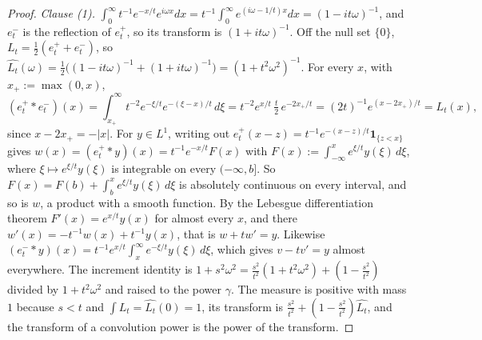 \begin{proof}
\leanok
\emph{Clause (1).} $\int_0^\infty t^{-1}e^{-x/t}e^{i\omega x}dx = t^{-1}\int_0^\infty
e^{(i\omega - 1/t)x}dx = (1 - it\omega)^{-1}$, and $e^-_t$ is the reflection of $e^+_t$, so its
transform is $(1 + it\omega)^{-1}$. Off the null set $\{0\}$, $L_t = \tfrac12(e^+_t + e^-_t)$, so
$\widehat{L_t}(\omega) = \tfrac12\bigl((1 - it\omega)^{-1} + (1 + it\omega)^{-1}\bigr) =
(1 + t^2\omega^2)^{-1}$. For every $x$, with $x_+ := \max(0, x)$,
\[
  (e^+_t * e^-_t)(x) = \int_{x_+}^\infty t^{-2}e^{-\xi/t}e^{-(\xi-x)/t}\,d\xi
   = t^{-2}e^{x/t}\,\tfrac t2\,e^{-2x_+/t} = (2t)^{-1}e^{(x - 2x_+)/t} = L_t(x) ,
\]
since $x - 2x_+ = -|x|$. For $y \in L^1$, writing out
$e^+_t(x - z) = t^{-1}e^{-(x-z)/t}\mathbf 1_{\{z < x\}}$ gives
$w(x) = (e^+_t * y)(x) = t^{-1}e^{-x/t}F(x)$ with $F(x) := \int_{-\infty}^xe^{\xi/t}y(\xi)\,d\xi$, where
$\xi \mapsto e^{\xi/t}y(\xi)$ is integrable on every $(-\infty, b]$. So
$F(x) = F(b) + \int_b^xe^{\xi/t}y(\xi)\,d\xi$ is absolutely continuous on every interval, and so is
$w$, a product with a smooth function. By the Lebesgue differentiation theorem
$F'(x) = e^{x/t}y(x)$ for almost every $x$, and there $w'(x) = -t^{-1}w(x) + t^{-1}y(x)$, that is
$w + tw' = y$. Likewise $(e^-_t * y)(x) = t^{-1}e^{x/t}\int_x^\infty e^{-\xi/t}y(\xi)\,d\xi$, which
gives $v - tv' = y$ almost everywhere. The increment identity is
$1 + s^2\omega^2 = \tfrac{s^2}{t^2}(1 + t^2\omega^2) + (1 - \tfrac{s^2}{t^2})$ divided by
$1 + t^2\omega^2$ and raised to the power $\gamma$. The measure is positive with mass $1$ because
$s < t$ and $\int L_t = \widehat{L_t}(0) = 1$, its transform is
$\tfrac{s^2}{t^2} + (1 - \tfrac{s^2}{t^2})\widehat{L_t}$, and the transform of a convolution power
is the power of the transform.


\end{proof}
